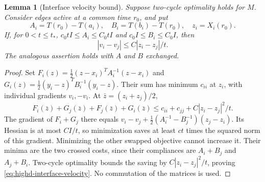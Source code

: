 \documentclass[11pt,reqno]{amsart}
\newtheorem{lemma}[theorem]{Lemma}
\theoremstyle{definition}
\theoremstyle{remark}
\numberwithin{equation}{section}
\begin{document}
\begin{lemma}[Interface velocity bound]
\label{lem:highd-interface-velocity}
Suppose two-cycle optimality holds for \(M\). Consider edges active at
a common time \(r_0\), and put
\[
 A_i=T(r_0)-T(a_i),\quad B_i=T(b_i)-T(r_0),\quad
 z_i=X_i(r_0).
\]
If, for \(0<t\le t_*\),
\(c_0tI\le A_i\le C_0tI\) and \(c_0I\le B_i\le C_0I\), then
\begin{equation}
\label{eq:highd-interface-velocity}
 |v_i-v_j|\le C|z_i-z_j|/t.
\end{equation}
The analogous assertion holds with \(A\) and \(B\) exchanged.
\end{lemma}
\begin{proof}
Set \(F_i(z)=\tfrac12(z-x_i)^TA_i^{-1}(z-x_i)\) and
\(G_i(z)=\tfrac12(y_i-z)^TB_i^{-1}(y_i-z)\).
Their sum has minimum \(c_{ii}\) at \(z_i\), with individual gradients
\(v_i,-v_i\). At \(\bar z=(z_i+z_j)/2\),
\[
 F_i(\bar z)+G_j(\bar z)+F_j(\bar z)+G_i(\bar z)
 \le c_{ii}+c_{jj}+C|z_i-z_j|^2/t.
\]
The gradient of \(F_i+G_j\) there equals
\(v_i-v_j+\tfrac12(A_i^{-1}-B_j^{-1})(z_j-z_i)\).
Its Hessian is at most \(CI/t\), so minimization saves at least
\(ct\) times the squared norm of this gradient. Minimizing the other
swapped objective cannot increase it. Their minima are the two crossed
costs, since their compliances are \(A_i+B_j\) and \(A_j+B_i\).
Two-cycle optimality bounds the saving by \(C|z_i-z_j|^2/t\), proving
\eqref{eq:highd-interface-velocity}. No commutation of the matrices is
used.
\end{proof}
\end{document}
